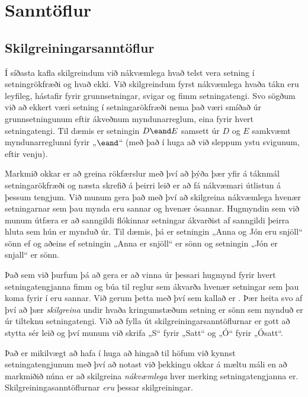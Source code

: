 \part{Sanntöflur}
\label{ch.TruthTables}

\chapter{Skilgreiningarsanntöflur}\label{s:CharacteristicTruthTables}

Í síðasta kafla skilgreindum við nákvæmlega hvað telst vera setning í setningrökfræði og hvað ekki. Við skilgreindum fyrst nákvæmlega hvaða tákn eru leyfileg, hástafir fyrir grunnsetningar, svigar og fimm setningatengi. Svo sögðum við að ekkert væri setning í setningarökfræði nema það væri smíðað úr grunnsetningunum eftir ákveðnum myndunarreglum, eina fyrir hvert setningatengi. Til dæmis er setningin $D \eand E$ samsett úr $D$ og $E$ samkvæmt myndunarreglunni fyrir „$\eand$“ (með það í huga að við sleppum ystu svigunum, eftir venju).

Markmið okkar er að greina rökfærslur með því að þýða þær yfir á táknmál setningarökfræði og næsta skrefið á þeirri leið er að fá nákvæmari útlistun á þessum tengjum. Við munum gera það með því að skilgreina nákvæmlega hvenær setningarnar sem þau mynda eru sannar og hvenær ósannar. Hugmyndin sem við munum útfæra er að sanngildi flókinnar setningar ákvarðist af sanngildi þeirra hluta sem hún er mynduð úr. Til dæmis, þá er setningin „Anna og Jón eru snjöll“ sönn ef og aðeins ef setningin „Anna er snjöll“ er sönn og setningin „Jón er snjall“ er sönn. 

Það sem við þurfum þá að gera er að vinna úr þessari hugmynd fyrir hvert setningatengjanna fimm og búa til reglur sem ákvarða hvenær setningar sem þau koma fyrir í eru sannar. Við gerum þetta með því sem kallað er . Þær heita svo af því að þær \emph{skilgreina} undir hvaða kringumstæðum setning er sönn sem mynduð er úr tilteknu setningatengi. Við að fylla út skilgreiningarsanntöflurnar er gott að stytta sér leið og því munum við skrifa „S“ fyrir „Satt“ og „Ó“ fyrir „Ósatt“. 

Það er mikilvægt að hafa í huga að hingað til höfum við kynnst setningatengjunum með því að notast við þekkingu okkar á mæltu máli en að markmiðið núna er að skilgreina \emph{nákvæmlega} hver merking setningatengjanna er. Skilgreiningasanntöflurnar \emph{eru} þessar skilgreiningar.

